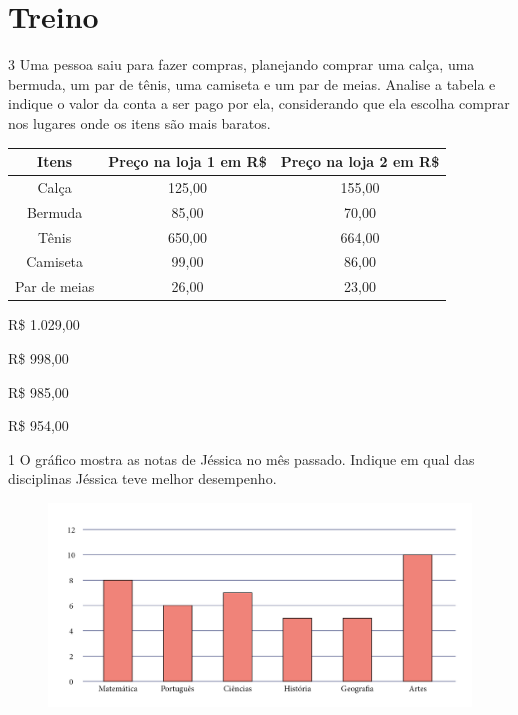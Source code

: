 \section*{Treino}

\num{3} Uma pessoa saiu para fazer compras, planejando comprar uma calça, uma bermuda, um par de tênis, uma camiseta e um par de meias. Analise a tabela e indique o valor da conta a ser pago por ela, considerando que ela escolha comprar nos lugares onde os
itens são mais baratos.

\begin{table}[H]
\begin{tabular}{|c|c|c|}
\hline
\textbf{Itens} & \textbf{Preço na loja 1 em R\$} & \textbf{Preço na loja 2 em R\$} \\ \hline
Calça          & 125,00                          & 155,00                          \\ \hline
Bermuda        & 85,00                           & 70,00                           \\ \hline
Tênis          & 650,00                          & 664,00                          \\ \hline
Camiseta       & 99,00                           & 86,00                           \\ \hline
Par de meias   & 26,00                           & 23,00                           \\ \hline
\end{tabular}
\end{table}

\begin{escolha}[itemsep=-5pt]
\begin{multicols}{2}
\item R\$ 1.029,00

\item R\$ 998,00

\item R\$ 985,00

\item R\$ 954,00
\end{multicols}
\end{escolha}

\num{1} O gráfico mostra as notas de Jéssica no mês passado. Indique em
qual das disciplinas Jéssica teve melhor desempenho.

\vspace*{-1em}

\begin{figure}[H]
\includegraphics[width=\textwidth]{./media/image100.png}
\end{figure}

